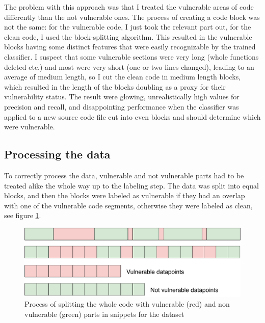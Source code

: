 \documentclass[
	a4paper,
	pagesize,
	pdftex,
	12pt,
	twoside, %
	BCOR=5mm, %
	ngerman,
	fleqn,
	final,
	]{scrartcl}
\begin{document}
The problem with this approach was that I treated the vulnerable areas of code differently than the not vulnerable ones. The process of creating a code block was not the same: for the vulnerable code, I just took the relevant part out, for the clean code, I used the block-splitting algorithm. This resulted in the vulnerable blocks having some distinct features that were easily recognizable by the trained classifier. I suspect that some vulnerable sections were very long (whole functions deleted etc.) and most were very short (one or two lines changed), leading to an average of medium length, so I cut the clean code in medium length blocks, which resulted in the length of the blocks doubling as a proxy for their vulnerability status. The result were glowing, unrealistically high values for precision and recall, and disappointing performance when the classifier was applied to a new source code file cut into even blocks and should determine which were vulnerable.\\

\subsection{Processing the data}\label{Processing}
To correctly process the data, vulnerable and not vulnerable parts had to be treated alike the whole way up to the labeling step. The data was split into equal blocks, and then the blocks were labeled as vulnerable if they had an overlap with one of the vulnerable code segments, otherwise they were labeled as clean, see figure \ref{fig:collectData2}.

\begin{figure}[ht]
	\centering
	\includegraphics[width=0.8\linewidth]{img/collectData2}
	\caption{Process of splitting the whole code with vulnerable (red) and non vulnerable (green) parts in snippets for the dataset}
	\label{fig:collectData2}
\end{figure}
\end{document}

